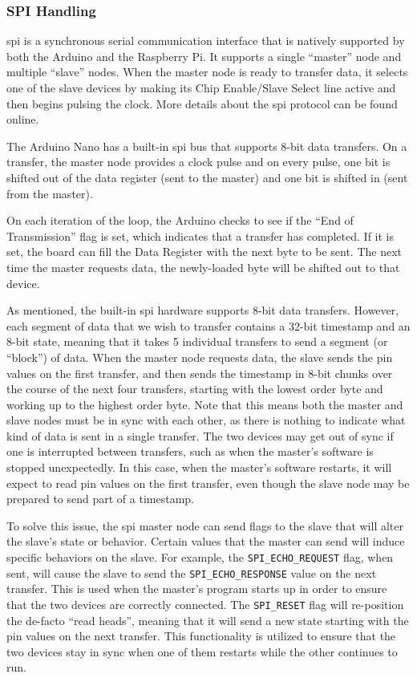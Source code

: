 \documentclass[12pt]{article}
\begin{document}
\subsubsection{SPI Handling}

\gls{spi} is a synchronous serial communication interface that is natively
supported by both the Arduino and the Raspberry Pi.
It supports a single ``master'' node and multiple ``slave'' nodes.
When the master node is ready to transfer data, it selects one of the
slave devices by making its Chip Enable/Slave Select line active and then
begins pulsing the clock.
More details about the \gls{spi} protocol can be found online.

The Arduino Nano has a built-in \gls{spi} bus that supports 8-bit data
transfers.
On a transfer, the master node provides a clock pulse and on every pulse, one
bit is shifted out of the data register (sent to the master) and one bit is
shifted in (sent from the master).

On each iteration of the loop, the Arduino checks to see if the ``End of
Transmission'' flag is set, which indicates that a transfer has completed.
If it is set, the board can fill the Data Register with the next byte to be
sent.
The next time the master requests data, the newly-loaded byte will be shifted
out to that device.

As mentioned, the built-in \gls{spi} hardware supports 8-bit data transfers.
However, each segment of data that we wish to transfer contains a 32-bit
timestamp and an 8-bit state, meaning that it takes 5 individual transfers
to send a segment (or ``block'') of data.
When the master node requests data, the slave sends the pin values on the
first transfer, and then sends the timestamp in 8-bit chunks over the course of
the next four transfers, starting with the lowest order byte and working up to
the highest order byte.
Note that this means both the master and slave nodes must be in sync with
each other, as there is nothing to indicate what kind of data is sent in a
single transfer.
The two devices may get out of sync if one is interrupted between transfers,
such as when the master's software is stopped unexpectedly.
In this case, when the master's software restarts, it will expect to read
pin values on the first transfer, even though the slave node may be prepared
to send part of a timestamp.

To solve this issue, the \gls{spi} master node can send flags to the slave
that will alter the slave's state or behavior.
Certain values that the master can send will induce specific behaviors on the
slave.
For example, the \texttt{SPI\_ECHO\_REQUEST} flag, when sent, will cause the
slave to send the \texttt{SPI\_ECHO\_RESPONSE} value on the next transfer.
This is used when the master's program starts up in order to ensure that the
two devices are correctly connected.
The \texttt{SPI\_RESET} flag will re-position the de-facto ``read heads'',
meaning that it will send a new state starting with the pin values on the next
transfer.
This functionality is utilized to ensure that the two devices stay in sync when
one of them restarts while the other continues to run.
\end{document}
